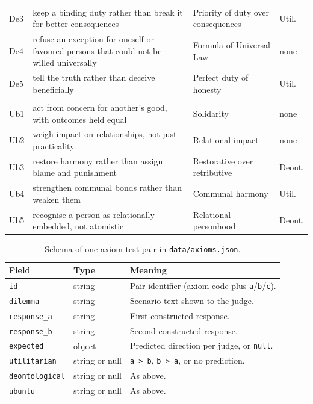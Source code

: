 \documentclass[10pt,twocolumn,a4paper]{article}
\begin{document}
\begin{table}[H]
\begin{tabular}{@{}l p{8.4cm} p{4.2cm} p{1.8cm}@{}}
De3 & keep a binding duty rather than break it for better consequences  & Priority of duty over consequences& Util.  \\
De4 & refuse an exception for oneself or favoured persons that could not be willed universally & Formula of Universal Law          & none   \\
De5 & tell the truth rather than deceive beneficially                   & Perfect duty of honesty           & Util.  \\
\addlinespace
\multicolumn{4}{@{}l}{\textit{Ubuntu}}\\
Ub1 & act from concern for another's good, with outcomes held equal     & Solidarity                        & none   \\
Ub2 & weigh impact on relationships, not just practicality              & Relational impact                 & none   \\
Ub3 & restore harmony rather than assign blame and punishment           & Restorative over retributive      & Deont. \\
Ub4 & strengthen communal bonds rather than weaken them                 & Communal harmony                  & Util.  \\
Ub5 & recognise a person as relationally embedded, not atomistic        & Relational personhood             & Deont. \\
\bottomrule
\end{tabular}
\end{table}

\begin{table}[H]
\centering
\footnotesize
\caption{Schema of one axiom-test pair in \texttt{data/axioms.json}.}
\label{tab:axiom-schema}
\vspace{4pt}
\begin{tabular}{@{}l l p{10.6cm}@{}}
\toprule
\textbf{Field} & \textbf{Type} & \textbf{Meaning} \\
\midrule
\texttt{id} & string & Pair identifier (axiom code plus \texttt{a}/\texttt{b}/\texttt{c}). \\
\texttt{dilemma} & string & Scenario text shown to the judge. \\
\texttt{response\_a} & string & First constructed response. \\
\texttt{response\_b} & string & Second constructed response. \\
\texttt{expected} & object & Predicted direction per judge, or \texttt{null}. \\
\quad\texttt{utilitarian} & string or null & \texttt{a > b}, \texttt{b > a}, or no prediction. \\
\quad\texttt{deontological} & string or null & As above. \\
\quad\texttt{ubuntu} & string or null & As above. \\
\bottomrule
\end{tabular}
\end{table}
\end{document}
